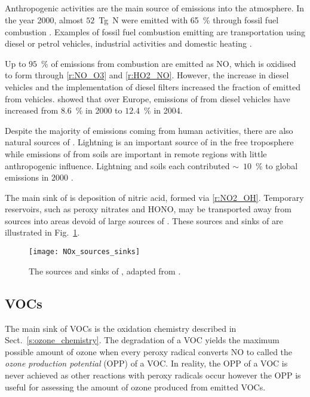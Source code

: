 \subsection[NOx]{}
Anthropogenic activities are the main source of  emissions into the atmosphere.
In the year 2000, almost $52$~Tg~N were emitted with 65~\% through fossil fuel combustion \citep{Seinfeld:2006}. 
Examples of fossil fuel combustion emitting  are transportation using diesel or petrol vehicles, industrial activities and domestic heating \citep{vonSchneidemesser:2015}.

Up to $95$~\% of  emissions from combustion are emitted as NO, which is oxidised to form  through \eqref{r:NO_O3} and \eqref{r:HO2_NO}.
However, the increase in diesel vehicles and the implementation of diesel filters increased the fraction of emitted  from vehicles.
\citet{Grice:2009} showed that over Europe, emissions of  from diesel vehicles have increased from $8.6$~\% in 2000 to $12.4$~\% in 2004.

Despite the majority of  emissions coming from human activities, there are also natural sources of .
Lightning is an important source of  in the free troposphere while emissions of  from soils are important in remote regions with little anthropogenic influence.
Lightning and soils each contributed $\sim$~$10$~\% to global  emissions in 2000 \citep{Seinfeld:2006}.

The main sink of  is deposition of nitric acid, formed via \eqref{r:NO2_OH}.
Temporary reservoirs, such as peroxy nitrates and HONO, may be transported away from sources into areas devoid of large sources of .
These sources and sinks of  are illustrated in Fig.~\ref{f:NOx_sources_sinks}.
\begin{figure}[t]%
	\begin{center}%
        \caption[ sources and sinks]{The sources and sinks of , adapted from \citet{Seinfeld:2006}.}%
        \texttt{[image: NOx\_sources\_sinks]}%
        \label{f:NOx_sources_sinks}%
	\end{center}%
\end{figure}%

\subsection{VOCs}
The main sink of VOCs is the oxidation chemistry described in Sect.~\ref{s:ozone_chemistry}.
The degradation of a VOC yields the maximum possible amount of ozone when every peroxy radical converts NO to  called the \emph{ozone production potential} (OPP) of a VOC.
In reality, the OPP of a VOC is never achieved as other reactions with peroxy radicals occur however the OPP is useful for assessing the amount of ozone produced from emitted VOCs.

